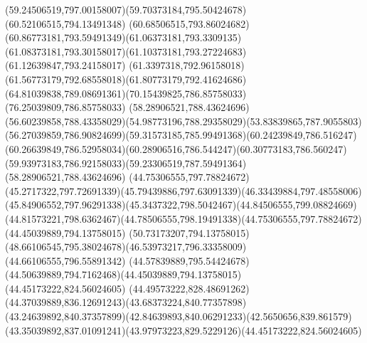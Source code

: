 {{\curveto(59.24506519,797.00158007)(59.70373184,795.50424678)(60.52106515,794.13491348)
\curveto(60.68506515,793.86024682)(60.86773181,793.59491349)(61.06373181,793.3309135)
\curveto(61.08373181,793.30158017)(61.10373181,793.27224683)(61.12639847,793.24158017)
\curveto(61.3397318,792.96158018)(61.56773179,792.68558018)(61.80773179,792.41624686)
\curveto(64.81039838,789.08691361)(70.15439825,786.85758033)(76.25039809,786.85758033)
\moveto(58.28906521,788.43624696)
\curveto(56.60239858,788.43358029)(54.98773196,788.29358029)(53.83839865,787.9055803)
\curveto(56.27039859,786.90824699)(59.31573185,785.99491368)(60.24239849,786.516247)
\curveto(60.26639849,786.52958034)(60.28906516,786.544247)(60.30773183,786.560247)
\curveto(59.93973183,786.92158033)(59.23306519,787.59491364)(58.28906521,788.43624696)
\moveto(44.75306555,797.78824672)
\curveto(45.2717322,797.72691339)(45.79439886,797.63091339)(46.33439884,797.48558006)
\curveto(45.84906552,797.96291338)(45.3437322,798.5042467)(44.84506555,799.08824669)
\curveto(44.81573221,798.6362467)(44.78506555,798.19491338)(44.75306555,797.78824672)
\moveto(44.45039889,794.13758015)
\lineto(50.73173207,794.13758015)
\curveto(48.66106545,795.38024678)(46.53973217,796.33358009)(44.66106555,796.55891342)
\curveto(44.57839889,795.54424678)(44.50639889,794.7162468)(44.45039889,794.13758015)
\moveto(44.45173222,824.56024605)
\curveto(44.49573222,828.48691262)(44.37039889,836.12691243)(43.68373224,840.77357898)
\curveto(43.24639892,840.37357899)(42.84639893,840.06291233)(42.5650656,839.861579)
\curveto(43.35039892,837.01091241)(43.97973223,829.5229126)(44.45173222,824.56024605)
}
}

{
}

